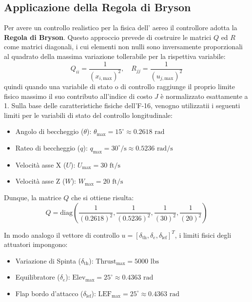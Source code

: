 \subsection{Applicazione della Regola di Bryson}
Per  avere un controllo realistico per la fisica dell' aereo il controllore adotta la \textbf{Regola di Bryson}\cite{Astrom2008}. Questo approccio prevede di costruire le matrici $Q$ ed $R$ come matrici diagonali, i cui elementi non nulli sono inversamente proporzionali al quadrato della massima variazione tollerabile per la rispettiva variabile:
\begin{equation}
	Q_{ii} = \frac{1}{(x_{i,\text{max}})^2}, \quad R_{jj} = \frac{1}{(u_{j,\text{max}})^2}
\end{equation}
quindi quando una variabile di stato o di controllo raggiunge il proprio limite fisico massimo il suo contributo all'indice di costo $J$ è normalizzato esattamente a 1. Sulla base delle caratteristiche fisiche dell'F-16, venogno utilizzatii i seguenti limiti per le variabili di stato del controllo longitudinale:
\begin{itemize}
	\item Angolo di beccheggio ($\theta$): $\theta_{\text{max}} = 15^\circ \approx 0.2618 \text{ rad}$
	\item Rateo di beccheggio ($q$): $q_{\text{max}} = 30^\circ/\text{s} \approx 0.5236 \text{ rad/s}$
	\item Velocità asse X ($U$): $U_{\text{max}} = 30 \text{ ft/s}$
	\item Velocità asse Z ($W$): $W_{\text{max}} = 20 \text{ ft/s}$
\end{itemize}

Dunque, la matrice $Q$ che si ottiene risulta:
\begin{equation}
	Q = \text{diag}\left( \frac{1}{(0.2618)^2}, \frac{1}{(0.5236)^2}, \frac{1}{(30)^2}, \frac{1}{(20)^2} \right)
\end{equation}

In modo analogo il vettore di controllo $u = [\delta_{\text{th}}, \delta_e, \delta_{\text{lef}}]^T$, i limiti fisici degli attuatori impongono:
\begin{itemize}
	\item Variazione di Spinta ($\delta_{\text{th}}$): $\text{Thrust}_{\text{max}} = 5000 \text{ lbs}$
	\item Equilibratore ($\delta_e$): $\text{Elev}_{\text{max}} = 25^\circ \approx 0.4363 \text{ rad}$
	\item Flap bordo d'attacco ($\delta_{\text{lef}}$): $\text{LEF}_{\text{max}} = 25^\circ \approx 0.4363 \text{ rad}$
\end{itemize}

